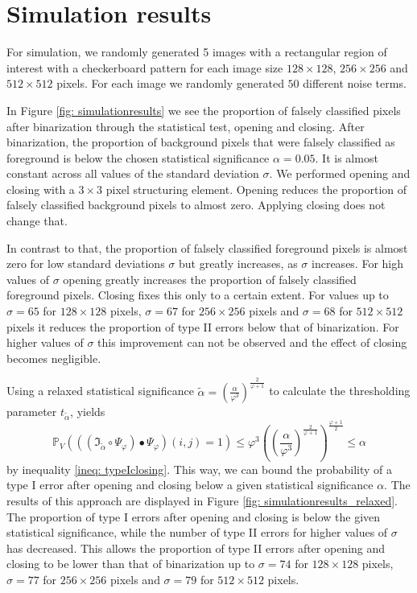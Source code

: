 \documentclass[a4paper,12pt]{article}
\theoremstyle{plain}
\theoremstyle{definition}
\begin{document}
\newpage



\section{Simulation results}\label{section: simulationresults}

For simulation, we randomly generated 5 images with a rectangular region of interest with a checkerboard pattern for each image size $128 \times 128$, $256 \times 256$ and $512 \times 512$ pixels. For each image we randomly generated $50$ different noise terms.

In Figure \ref{fig: simulationresults} we see the proportion of falsely classified pixels after binarization through the statistical test, opening and closing. After binarization, the proportion of background pixels that were falsely classified as foreground is below the chosen statistical significance $\alpha = 0.05$. It is almost constant across all values of the standard deviation $\sigma$. We performed opening and closing with a $3 \times 3$ pixel structuring element. Opening reduces the proportion of falsely classified background pixels to almost zero. Applying closing does not change that.

In contrast to that, the proportion of falsely classified foreground pixels is almost zero for low standard deviations $\sigma$ but greatly increases, as $\sigma$ increases. For high values of $\sigma$ opening greatly increases the proportion of falsely classified foreground pixels. Closing fixes this only to a certain extent. For values up to $\sigma = 65$ for $128 \times 128$ pixels, $\sigma = 67$ for $256 \times 256$ pixels and $\sigma = 68$ for $512 \times 512$ pixels it reduces the proportion of type II errors below that of binarization. For higher values of $\sigma$ this improvement can not be observed and the effect of closing becomes negligible.

Using a relaxed statistical significance $\tilde{\alpha} = \left( \frac{\alpha}{\varphi^3} \right)^{\frac{2}{\varphi + 1}}$ to calculate the thresholding parameter $t_{\tilde{\alpha}}$, yields
\begin{equation*}
	\mathbb{P}_V\left( ((\mathfrak{I}_{\tilde{\alpha}} \circ \Psi_\varphi) \bullet \Psi_\varphi)(i, j) = 1 \right) \leq \varphi^3 \left( \left( \frac{\alpha}{\varphi^3} \right)^{\frac{2}{\varphi + 1}} \right)^{\frac{\varphi + 1}{2}} \leq \alpha
\end{equation*}
by inequality \eqref{ineq: typeIclosing}. This way, we can bound the probability of a type I error after opening and closing below a given statistical significance $\alpha$. The results of this approach are displayed in Figure \ref{fig: simulationresults_relaxed}. The proportion of type I errors after opening and closing is below the given statistical significance, while the number of type II errors for higher values of $\sigma$ has decreased. This allows the proportion of type II errors after opening and closing to be lower than that of binarization up to $\sigma = 74$ for $128 \times 128$ pixels, $\sigma = 77$ for $256 \times 256$ pixels and $\sigma = 79$ for $512 \times 512$ pixels.
\end{document}
